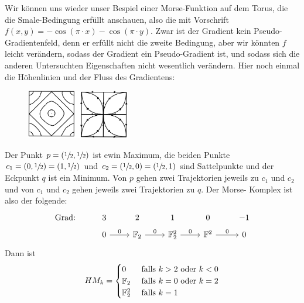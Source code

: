 \begin{example}
    Wir können uns wieder unser Bespiel einer Morse-Funktion auf dem Torus, die die Smale-Bedingung 
    erfüllt anschauen, also die mit Vorschrift $f(x, y) = -\cos (\pi \cdot x) - \cos(\pi \cdot y)$.
    Zwar ist der Gradient kein Pseudo-Gradientenfeld, denn er erfüllt nicht die zweite Bedingung,
    aber wir könnten $f$ leicht verändern, sodass der Gradient ein Pseudo-Gradient ist, und sodass
    sich die anderen Untersuchten Eigenschaften nicht wesentlich verändern.
    Hier noch einmal die Höhenlinien und der Fluss des Gradientens:
    \begin{figure}[H]
        \centering
        \includegraphics[width=0.4\textwidth]{../resources/morse-funktion-torus.jpeg}
    \end{figure}
    Der Punkt $p = (\sfrac{1}{2}, \sfrac{1}{2})$ ist ewin Maximum, die beiden Punkte 
        $c_1 = (0, \sfrac{1}{2}) = (1, \sfrac{1}{2})$ und $c_2 = (\sfrac{1}{2}, 0) = (\sfrac{1}{2}, 1)$
        sind Sattelpunkte und der Eckpunkt $q$ ist ein Minimum. Von $p$ gehen zwei Trajektorien jeweils
        zu $c_1$ und $c_2$ und von $c_1$ und $c_2$ gehen jeweils zwei Trajektorien zu $q$. Der Morse-
        Komplex ist also der folgende:
        \[ \begin{tikzcd}[row sep=tiny]
            \text{Grad:} & 3 & 2 & 1 & 0 & -1 \\
            & 0 \arrow[r, "0"] & \F_2 \arrow[r, "0"] & \F_2^2 \arrow[r, "0"] & \F^2 \arrow[r, "0"] & 0
        \end{tikzcd} \]
        Dann ist 
        \[ HM_k = \begin{cases}
            0 & \text{ falls } k > 2 \text{ oder } k < 0 \\
            { \mathbb F }_2 & \text{ falls } k = 0 \text{ oder } k = 2 \\
            { \mathbb F }_2^2 & \text{ falls } k = 1
        \end{cases} \]
\end{example}


